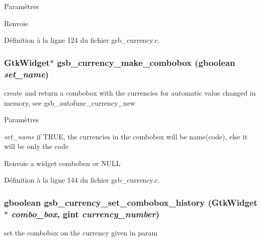 \begin{DoxyParams}{Paramètres}
\item[{\em }]\end{DoxyParams}
\begin{DoxyReturn}{Renvoie}

\end{DoxyReturn}


Définition à la ligne 124 du fichier gsb\_\-currency.c.

\subsubsection[{gsb\_\-currency\_\-make\_\-combobox}]{\setlength{\rightskip}{0pt plus 5cm}GtkWidget$\ast$ gsb\_\-currency\_\-make\_\-combobox (gboolean {\em set\_\-name})}\label{gsb__currency_8c_ad0c6f15f859f45a94923fa743d81f5b5}
create and return a combobox with the currencies for automatic value changed in memory, see gsb\_\-autofunc\_\-currency\_\-new


\begin{DoxyParams}{Paramètres}
\item[{\em set\_\-name}]if TRUE, the currencies in the combobox will be name(code), else it will be only the code\end{DoxyParams}
\begin{DoxyReturn}{Renvoie}
a widget combobox or NULL 
\end{DoxyReturn}


Définition à la ligne 144 du fichier gsb\_\-currency.c.

\subsubsection[{gsb\_\-currency\_\-set\_\-combobox\_\-history}]{\setlength{\rightskip}{0pt plus 5cm}gboolean gsb\_\-currency\_\-set\_\-combobox\_\-history (GtkWidget $\ast$ {\em combo\_\-box}, \/  gint {\em currency\_\-number})}\label{gsb__currency_8c_a8774e282bad3c3101b161fd54bcb660a}
set the combobox on the currency given in param

